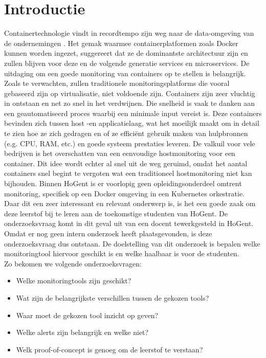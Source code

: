 
\section{Introductie} %
\label{sec:introductie}
Containertechnologie vindt in recordtempo zijn weg naar de data-omgeving van de ondernemingen \autocite{Cole2016}. Het gemak waarmee containerplatformen zoals Docker kunnen worden ingezet, suggereert dat ze de dominantste architectuur zijn en zullen blijven voor deze en de volgende generatie services en microservices.
De uitdaging om een goede monitoring van containers op te stellen is belangrijk. Zoals te verwachten, zullen traditionele monitoringsplatforms die vooral gebaseerd zijn op virtualisatie, niet voldoende zijn. Containers zijn zeer vluchtig in ontstaan en net zo snel in het verdwijnen. Die snelheid is vaak te danken aan een geautomatiseerd proces waarbij een minimale input vereist is. Deze containers bevinden zich tussen host -en applicatielaag, wat het moeilijk maakt om in detail te zien hoe ze zich gedragen en of ze efficiënt gebruik maken van hulpbronnen (e.g. CPU, RAM, etc.) en goede systeem prestaties leveren. De valkuil voor vele bedrijven is het overschatten van een eenvoudige hostmonitoring voor een container. Dit idee wordt echter al snel uit de weg geruimd, omdat het aantal containers snel begint te vergoten wat een traditioneel hostmonitoring niet kan bijhouden.
Binnen HoGent is er voorlopig geen opleidingsonderdeel omtrent monitoring, specifiek op een Docker omgeving in een Kubernetes orkestratie. Daar dit een zeer interessant en relevant onderwerp is, is het een goede zaak om deze leerstof bij te leren aan de toekomstige studenten van HoGent. De onderzoeksvraag komt in dit geval uit van een docent tewerkgesteld in HoGent. Omdat er nog geen intern onderzoek heeft plaatsgevonden, is deze onderzoeksvraag dus ontstaan. De doelstelling van dit onderzoek is bepalen welke monitoringtool hiervoor geschikt is en welke haalbaar is voor de studenten. 
\\
Zo bekomen we volgende onderzoeksvragen:

\begin{itemize}
    \item Welke monitoringtools zijn geschikt?
    \item Wat zijn de belangrijkste verschillen tussen de gekozen tools?
    \item Waar moet de gekozen tool inzicht op geven?
    \item Welke alerts zijn belangrijk en welke niet?
    \item Welk proof-of-concept is genoeg om de leerstof te verstaan?
\end{itemize}

